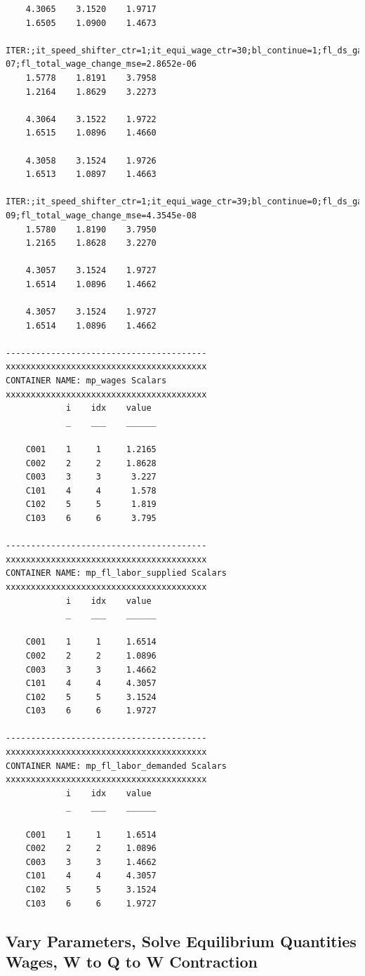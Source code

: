\documentclass[
]{book}
\begin{document}
\begin{verbatim}
    4.3065    3.1520    1.9717
    1.6505    1.0900    1.4673

ITER:;it_speed_shifter_ctr=1;it_equi_wage_ctr=30;bl_continue=1;fl_ds_gap_mse=6.0214e-07;fl_total_wage_change_mse=2.8652e-06
    1.5778    1.8191    3.7958
    1.2164    1.8629    3.2273

    4.3064    3.1522    1.9722
    1.6515    1.0896    1.4660

    4.3058    3.1524    1.9726
    1.6513    1.0897    1.4663

ITER:;it_speed_shifter_ctr=1;it_equi_wage_ctr=39;bl_continue=0;fl_ds_gap_mse=9.1058e-09;fl_total_wage_change_mse=4.3545e-08
    1.5780    1.8190    3.7950
    1.2165    1.8628    3.2270

    4.3057    3.1524    1.9727
    1.6514    1.0896    1.4662

    4.3057    3.1524    1.9727
    1.6514    1.0896    1.4662

----------------------------------------
xxxxxxxxxxxxxxxxxxxxxxxxxxxxxxxxxxxxxxxx
CONTAINER NAME: mp_wages Scalars
xxxxxxxxxxxxxxxxxxxxxxxxxxxxxxxxxxxxxxxx
            i    idx    value 
            _    ___    ______

    C001    1     1     1.2165
    C002    2     2     1.8628
    C003    3     3      3.227
    C101    4     4      1.578
    C102    5     5      1.819
    C103    6     6      3.795

----------------------------------------
xxxxxxxxxxxxxxxxxxxxxxxxxxxxxxxxxxxxxxxx
CONTAINER NAME: mp_fl_labor_supplied Scalars
xxxxxxxxxxxxxxxxxxxxxxxxxxxxxxxxxxxxxxxx
            i    idx    value 
            _    ___    ______

    C001    1     1     1.6514
    C002    2     2     1.0896
    C003    3     3     1.4662
    C101    4     4     4.3057
    C102    5     5     3.1524
    C103    6     6     1.9727

----------------------------------------
xxxxxxxxxxxxxxxxxxxxxxxxxxxxxxxxxxxxxxxx
CONTAINER NAME: mp_fl_labor_demanded Scalars
xxxxxxxxxxxxxxxxxxxxxxxxxxxxxxxxxxxxxxxx
            i    idx    value 
            _    ___    ______

    C001    1     1     1.6514
    C002    2     2     1.0896
    C003    3     3     1.4662
    C101    4     4     4.3057
    C102    5     5     3.1524
    C103    6     6     1.9727
\end{verbatim}

\hypertarget{vary-parameters-solve-equilibrium-quantities-wages-w-to-q-to-w-contraction}{%
\subsection{Vary Parameters, Solve Equilibrium Quantities Wages, W to Q to W Contraction}\label{vary-parameters-solve-equilibrium-quantities-wages-w-to-q-to-w-contraction}}
\end{document}
